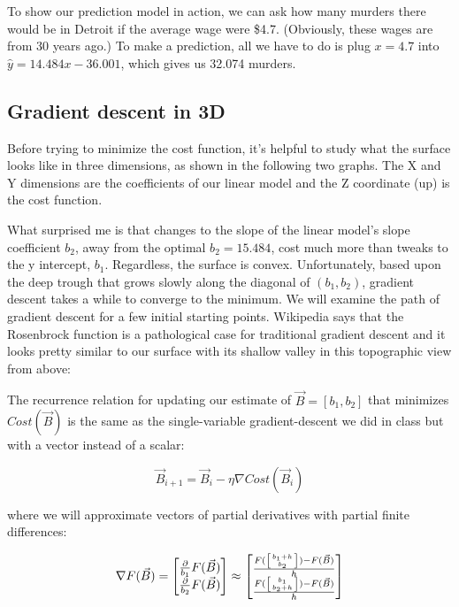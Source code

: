 \documentclass[titlepage]{tufte-book}
\begin{document}
\begin{fullwidth}
To show our prediction model in action, we can ask how many murders  there would be in Detroit if the average wage were \$4.7. (Obviously, these wages are from 30 years ago.) To make a prediction, all we have to do is plug $x=4.7$ into $\hat{y} = 14.484 x - 36.001$, which gives us 32.074 murders.

\subsection{Gradient descent in 3D}

Before trying to minimize the cost function, it's helpful to study what the surface looks like in three dimensions, as shown in the following two graphs. The X and Y dimensions are the coefficients of our linear model and the Z coordinate (up) is the cost function.


What surprised me is that changes to the slope of the linear model's slope coefficient $b_2$, away from the optimal $b_2=15.484$, cost much more than tweaks to the y intercept, $b_1$. Regardless, the surface is convex. Unfortunately, based upon the deep trough that grows slowly along the diagonal of $(b_1,b_2)$, gradient descent takes a while to converge to the minimum. We will examine the path of gradient descent for a few initial starting points. Wikipedia says that the Rosenbrock function is a pathological case for traditional gradient descent and it looks pretty similar to our surface with its shallow valley in this topographic view from above:


The recurrence relation for updating our estimate of $\vec{B}=[b_1, b_2]$ that minimizes $Cost(\vec{B})$ is the same as the single-variable gradient-descent we did in class but with a vector instead of a scalar:

\[
\vec{B}_{i+1} = \vec{B}_i - \eta \nabla Cost(\vec{B}_i)
\]

\noindent where we will approximate vectors of partial derivatives with partial finite differences:

\[
\nabla F(\vec{B}) =
\begin{bmatrix}
\frac{\partial}{b_1}{F(\vec{B})}\\
\frac{\partial}{b_2}{F(\vec{B})} \\
\end{bmatrix}
\approx
\begin{bmatrix}
\frac{F(\left[ b_1+h \above 0pt{b_2} \right]) - F(\vec{B})}{h} \\
\frac{F(\left[ b_1 \above 0pt{b_2+h} \right]) - F(\vec{B})}{h} \\
\end{bmatrix}
\]


\end{fullwidth}
\end{document}
